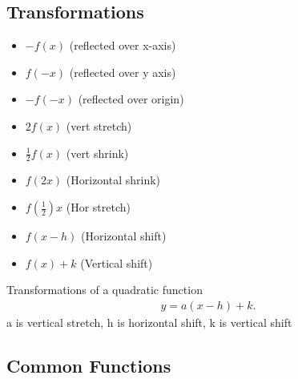 \documentclass{report}
\begin{document}
    
      \bigbreak \noindent \bigbreak \noindent 
      \subsection{Transformations}
      \begin{itemize}
        \item  $-f(x)$ (reflected over x-axis)
        \item $f(-x)$ (reflected over y axis)
        \item $-f(-x)$ (reflected over origin)
        \item $2f(x)$ (vert stretch)
        \item $\frac{1}{2}f(x)$ (vert shrink)
        \item $f(2x)$ (Horizontal shrink)
        \item $f(\frac{1}{2})x$ (Hor stretch)
        \item $f(x-h)$ (Horizontal shift)
        \item $f(x) +k$ (Vertical shift)
      \end{itemize}
      \bigbreak \noindent \bigbreak \noindent
      Transformations of a quadratic function
      \begin{align*}
        y = a(x-h) +k
      .\end{align*}
      \bigbreak \noindent \bigbreak \noindent
      a is vertical stretch, h is horizontal shift, k is vertical shift

    
    \pagebreak \bigbreak \noindent
    \subsection{Common Functions}
    \begin{figure}[ht]
        \centering
        \label{fig:xsquared}
        \label{fig:xcubed}
    \end{figure}

    \begin{figure}[ht]
        \centering
        \label{fig:sqrtx}
        \label{fig:cubrootx}
    \end{figure}


    \begin{figure}[ht]
        \centering
        \label{fig:1overx}
    \end{figure}

    \begin{figure}[ht]
      \centering
        \label{fig:absx}
    \end{figure}
\end{document}
